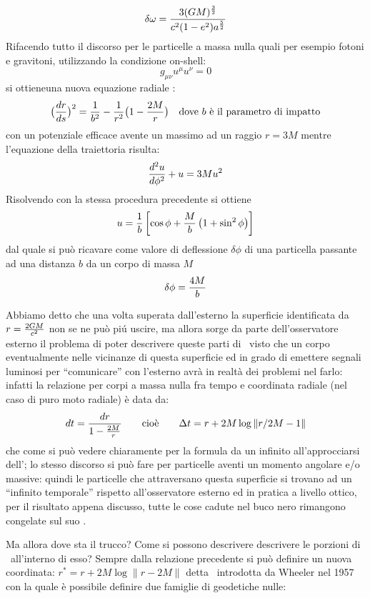$$
\delta\omega={3(GM)^{3\over 2}\over c^2(1-e^2)a^{5\over2}}
$$
Rifacendo tutto il discorso per le particelle a massa nulla quali per esempio fotoni e gravitoni, utilizzando la condizione on-shell:
$$
g_{\mu\nu}u^{\mu}u^{\nu}=0
$$
si ottieneuna nuova equazione radiale :
$$
\big({dr\over ds}\big)^2={1\over b^2}-{1\over r^2}\big(1-{2M\over r}\big)\quad \hbox{dove $b$ \`e il parametro di impatto}
$$
con un potenziale efficace avente un massimo ad un raggio $r=3M$ mentre l'equazione della traiettoria risulta:
$$
{d^2u\over d\phi^2}+u=3Mu^2
$$
Risolvendo con la stessa procedura precedente si ottiene
$$
u={1\over b}\left[\cos\phi+{M\over b}\left(1+\sin^2\phi\right)\right]
$$
dal quale si pu\`o ricavare come valore di deflessione $\delta\phi$ di una particella passante ad una distanza $b$ da un corpo di massa $M$
$$
\delta \phi={4M\over b }
$$
\par
Abbiamo detto che una volta superata dall'esterno la superficie identificata da $r={2GM\over c^2}$ non se ne pu\`o pi\'u uscire, ma allora sorge da parte dell'osservatore esterno il problema di poter descrivere queste parti di \ST\  visto che un corpo eventualmente nelle vicinanze di questa superficie ed in grado di emettere segnali luminosi per ``comunicare'' con l'esterno avr\`a in realt\`a dei problemi nel farlo: infatti la relazione per corpi a massa nulla fra tempo e coordinata radiale (nel caso di puro moto radiale) \`e data da:
$$
dt={dr\over 1-{2M\over r}}\qquad\hbox{cio\`e}\qquad\Delta t=r+2M\log\|r/2M-1\|
$$
che come si pu\`o vedere chiaramente per la formula da un infinito all'approcciarsi dell'\Oe; lo stesso discorso si pu\`o fare per particelle aventi un momento angolare e/o massive: quindi le particelle che attraversano questa superficie si trovano ad un ``infinito temporale'' rispetto all'osservatore esterno ed in pratica a livello ottico, per il risultato appena discusso, tutte le cose cadute nel buco nero rimangono congelate sul suo \Oe.\par
Ma allora dove sta il trucco? Come si possono descrivere descrivere le porzioni di \ST\ all'interno di esso? Sempre dalla relazione precedente si pu\`o definire un nuova coordinata: $r^{\ast}=r+2M\log\|r-2M\|$ detta \ introdotta da Wheeler nel 1957 con la quale \`e possibile definire due famiglie di geodetiche nulle:
